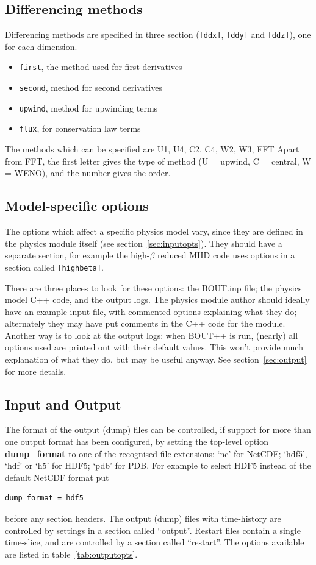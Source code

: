\documentclass[12pt]{article}
\newcommand{\code}[1]{\texttt{#1}}
\begin{document}
\subsection{Differencing methods}
%
\label{sec:diffmethodoptions}
%
%
Differencing methods are specified in three section (\code{[ddx]}, \code{[ddy]}
and \code{[ddz]}), one for each dimension.
%
\begin{itemize}
\item \code{first}, the method used for first derivatives
\item \code{second}, method for second derivatives
\item \code{upwind}, method for upwinding terms
\item \code{flux}, for conservation law terms
\end{itemize}
%
The methods which can be specified are U1, U4, C2, C4, W2, W3, FFT Apart from
FFT, the first letter gives the type of method (U = upwind, C = central, W =
WENO), and the number gives the order.



\subsection{Model-specific options}
%
The options which affect a specific physics model vary, since they are defined
in the physics module itself (see section~\ref{sec:inputopts}). They should
have a separate section, for example the high-$\beta$ reduced MHD code uses
options in a section called \code{[highbeta]}.

There are three places to look for these options: the BOUT.inp file; the
physics model C++ code, and the output logs. The physics module author should
ideally have an example input file, with commented options explaining what they
do; alternately they may have put comments in the C++ code for the module.
Another way is to look at the output logs: when BOUT++ is run, (nearly) all
options used are printed out with their default values. This won't provide much
explanation of what they do, but may be useful anyway.  See
section~\ref{sec:output} for more details.



\subsection{Input and Output}
%
\label{sec:iooptions}
%
The format of the output (dump) files can be controlled, if support for more
than one output format has been configured, by setting the top-level option
{\bf dump\_format} to one of the recognised file extensions: `nc' for NetCDF;
`hdf5', `hdf' or `h5' for HDF5; `pdb' for PDB. For example to select HDF5
instead of the default NetCDF format put
%
\begin{lstlisting}
dump_format = hdf5
\end{lstlisting}
%
before any section headers.
%
The output (dump) files with time-history are controlled by settings in a
section called ``output''.  Restart files contain a single time-slice, and are
controlled by a section called ``restart''. The options available are listed in
table~\ref{tab:outputopts}.
\end{document}
